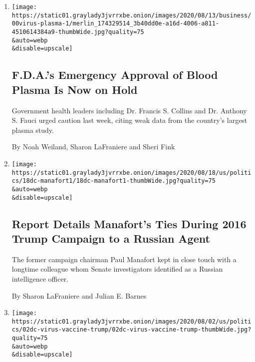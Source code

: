 \begin{enumerate}
\def\labelenumi{\arabic{enumi}.}
\item
  \href{/2020/08/19/us/politics/blood-plasma-covid-19.html}{}

  \texttt{[image: https://static01.graylady3jvrrxbe.onion/images/2020/08/13/business/00virus-plasma-1/merlin\_174329514\_3b40dd0e-a16d-4006-a811-4510614384a9-thumbWide.jpg?quality=75\\\&auto=webp\\\&disable=upscale]}

  \hypertarget{fdas-emergency-approval-of-blood-plasma-is-now-on-hold}{%
  \subsection{F.D.A.'s Emergency Approval of Blood Plasma Is Now on
  Hold}\label{fdas-emergency-approval-of-blood-plasma-is-now-on-hold}}

  Government health leaders including Dr. Francis S. Collins and Dr.
  Anthony S. Fauci urged caution last week, citing weak data from the
  country's largest plasma study.

  By Noah Weiland, Sharon LaFraniere and Sheri Fink
\item
  \href{/2020/08/18/us/politics/paul-manafort-konstantin-kilimnik.html}{}

  \texttt{[image: https://static01.graylady3jvrrxbe.onion/images/2020/08/18/us/politics/18dc-manafort1/18dc-manafort1-thumbWide.jpg?quality=75\\\&auto=webp\\\&disable=upscale]}

  \hypertarget{report-details-manaforts-ties-during-2016-trump-campaign-to-a-russian-agent}{%
  \subsection{Report Details Manafort's Ties During 2016 Trump Campaign
  to a Russian
  Agent}\label{report-details-manaforts-ties-during-2016-trump-campaign-to-a-russian-agent}}

  The former campaign chairman Paul Manafort kept in close touch with a
  longtime colleague whom Senate investigators identified as a Russian
  intelligence officer.

  By Sharon LaFraniere and Julian E. Barnes
\item
  \href{/2020/08/02/us/politics/coronavirus-vaccine.html}{}

  \texttt{[image: https://static01.graylady3jvrrxbe.onion/images/2020/08/02/us/politics/02dc-virus-vaccine-trump/02dc-virus-vaccine-trump-thumbWide.jpg?quality=75\\\&auto=webp\\\&disable=upscale]}


\end{enumerate}
